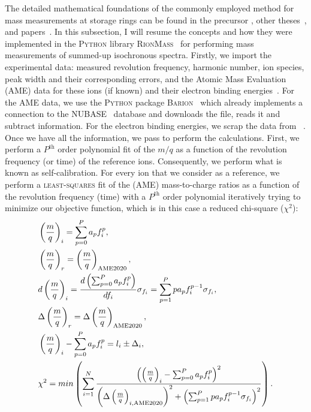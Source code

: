 The detailed mathematical foundations of the commonly employed method for mass measurements at storage rings can be found in the precursor \cite{AUDIcmm}, other theses~\cite{YuriPhD,MatosPhD,ShubinaPhD}, and papers~\cite{RADONcmmA}. In this subsection, I will resume the concepts and how they were implemented in the \textsc{Python} library \textsc{RionMass}~\cite{rionmass} for performing mass measurements of summed-up isochronous spectra.
\newpar
Firstly, we import the experimental data: measured revolution frequency, harmonic number, ion species, peak width and their corresponding errors, and the Atomic Mass Evaluation~\cite{AME-2020} (\textsc{AME}) data for these ions (if known) and their electron binding energies~\cite{NIST_ASD}. For the \textsc{AME} data, we use the \textsc{Python} package \textsc{Barion}~\cite{barion} which already implements a connection to the \textsc{NUBASE}~\cite{Nubase2020} database and downloads the file, reads it and subtract information. For the electron binding energies, we scrap the data from ~\cite{NIST_ASD}. Once we have all the information, we pass to perform the calculations. 
\newpar
First, we perform a $P^\mathrm{th}$ order polynomial fit of the $m/q$ as a function of the revolution frequency (or time) of the reference ions. Consequently, we perform what is known as self-calibration. For every ion that we consider as a reference, we perform a \textsc{least-squares} fit of the (\textsc{AME}) mass-to-charge ratios as a function of the revolution frequency (time) with a $P^\mathrm{th}$ order polynomial iteratively trying to minimize our objective function, which is in this case a reduced chi-square ($\chi^2$): 
\begin{align} 
    &\left(\frac{m}{q}\right)_{i} = \sum_{p=0}^{P} a_{p}f_{i}^{p}, \label{eq:chap2:cmm1}\\
    &\left(\frac{m}{q}\right)_{r} = \left(\frac{m}{q}\right)_{\mathrm{AME2020}}, \label{eq:chap2:cmm1ame}\\
    &d \left(\frac{m}{q}\right)_{i} = \frac{d \left(\sum_{p=0}^{P} a_{p}f_{i}^{p}\right)}{d f_{i}} \sigma_{f_{i}}= \sum_{p=1}^{P} pa_{p}f_{i}^{p-1}\sigma_{f_{i}},\label{eq:chap2:cmm2}\\
    &\Delta \left(\frac{m}{q}\right)_{r} = \Delta \left(\frac{m}{q}\right)_{\mathrm{AME2020}}, \label{eq:chap2:cmm2ame}\\
    &\left(\frac{m}{q}\right)_{i} - \sum_{p=0}^{P} a_{p}f_{i}^{p} = l_{i} \pm \Delta_{i}, \label{eq:chap2:cmm3}\\
    &\chi^2 = min\left(\sum_{i=1}^{N}  \frac{\left(\left(\frac{m}{q}\right)_{i} - \sum_{p=0}^{P} a_{p}f_{i}^{p}\right)^2}{\left(\Delta \left(\frac{m}{q}\right)_{i,\mathrm{AME2020}}\right)^2 + \left(\sum_{p=1}^{P} pa_{p}f_{i}^{p-1}\sigma_{f_{i}}\right)^2}\right).\label{eq:chap2:chi2} 
\end{align}
